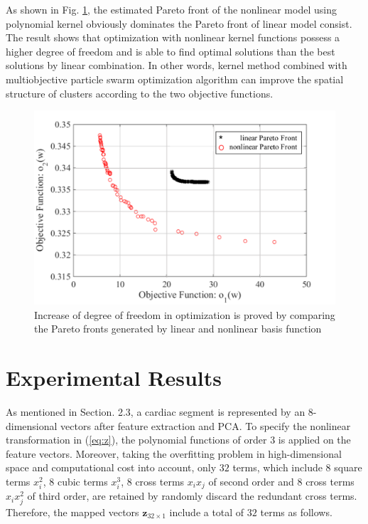 As shown in Fig. \ref{fig:pareto_compare}, the estimated Pareto front of the nonlinear model using polynomial kernel obviously dominates the Pareto front of linear model consist. The result shows that optimization with nonlinear kernel functions possess a higher degree of freedom and is able to find optimal solutions than the best solutions by linear combination. In other words, kernel method combined with multiobjective particle swarm optimization algorithm can improve the spatial structure of clusters according to the two objective functions.

\begin{figure}[t]
\centering
\includegraphics[scale=.6]{Fig/pareto_compare.pdf}
\caption{Increase of degree of freedom in optimization is proved by comparing the Pareto fronts generated by linear and nonlinear basis function}
\label{fig:pareto_compare}
\end{figure}

\section{Experimental Results}\label{sec:result1}

As mentioned in Section. 2.3, a cardiac segment is represented by an 8-dimensional vectors after feature extraction and PCA. %
To specify the nonlinear transformation in (\ref{eq:z}), the polynomial functions of order $3$ is applied on the feature vectors. Moreover, taking the overfitting problem in high-dimensional space and computational cost into account, only $32$ terms, which include 8 square terms $x_i^2$, 8 cubic terms $x_i^3$, 8 cross terms $x_ix_j$ of second order and 8 cross terms $x_i x_j^2$ of third order, are retained by randomly discard the redundant cross terms. Therefore, the mapped vectors $\mathbf{z}_{32 \times 1}$ include a total of $32$ terms as follows.


